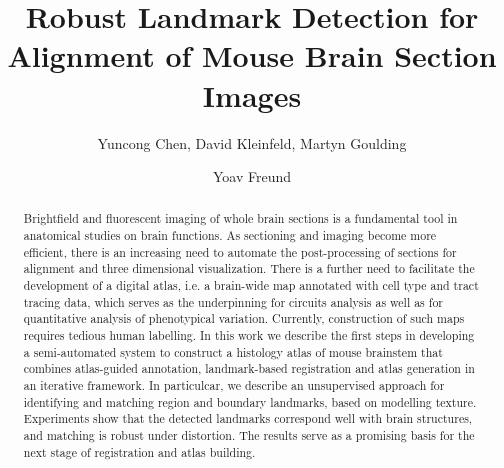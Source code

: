 \documentclass{llncs}
\begin{document}

%
%
\title{Robust Landmark Detection for Alignment of Mouse Brain Section Images}
%
%
\author{Yuncong Chen, David Kleinfeld, Martyn Goulding \and Yoav Freund}
%
%
%

\maketitle              %
\begin{abstract}

Brightfield and fluorescent imaging of whole brain sections is a fundamental tool in anatomical studies on brain functions. As sectioning and imaging become more efficient, there is an increasing need to automate the post-processing of sections for alignment and three dimensional visualization. There is a further need to facilitate the development of a digital atlas, i.e. a brain-wide map annotated with cell type and tract tracing data, which serves as the underpinning for circuits analysis as well as for quantitative analysis of phenotypical variation. Currently, construction of such maps requires tedious human labelling. In this work we describe the first steps in developing a semi-automated system to construct a histology atlas of mouse brainstem that combines atlas-guided annotation, landmark-based registration and atlas generation in an iterative framework. 
In particulcar, we describe an unsupervised approach for identifying and matching region and boundary landmarks, based on modelling texture. Experiments show that the detected landmarks correspond well with brain structures, and matching is robust under distortion. The results serve as a promising basis for the next stage of registration and atlas building.


\end{abstract}
%
\end{document}
